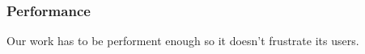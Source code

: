 


\subsubsection{Performance} %
\label{ssub:Performance}

Our work has to be performent enough so it doesn't frustrate its users.






